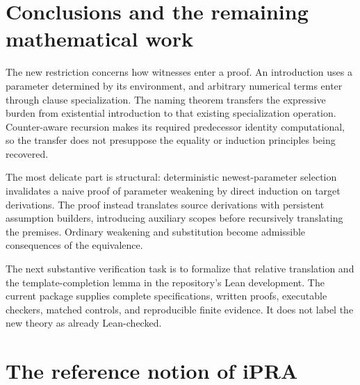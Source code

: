 \section{Conclusions and the remaining mathematical work}

The new restriction concerns how witnesses enter a proof. An introduction
uses a parameter determined by its environment, and arbitrary numerical
terms enter through clause specialization. The naming theorem transfers
the expressive burden from existential introduction to that existing
specialization operation. Counter-aware recursion makes its required
predecessor identity computational, so the transfer does not presuppose
the equality or induction principles being recovered.

The most delicate part is structural: deterministic newest-parameter
selection invalidates a naive proof of parameter weakening by direct
induction on target derivations. The proof instead translates source
derivations with persistent assumption builders, introducing auxiliary
scopes before recursively translating the premises. Ordinary weakening
and substitution become admissible consequences of the equivalence.

The next substantive verification task is to formalize that relative
translation and the template-completion lemma in the repository's Lean
development. The current package supplies complete specifications,
written proofs, executable checkers, matched controls, and reproducible
finite evidence. It does not label the new theory as already Lean-checked.

\appendix
\section{The reference notion of iPRA}

